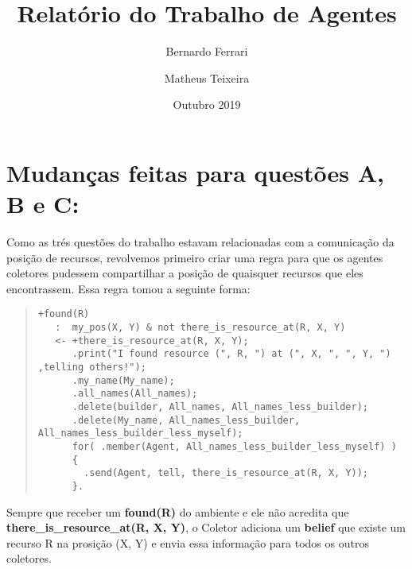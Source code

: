 \documentclass[12pt]{article}
\title{Relatório do Trabalho de Agentes}
\author{Bernardo Ferrari \and Matheus Teixeira}
\date{Outubro 2019}
\begin{document}
\maketitle

\section{Mudanças feitas para questões A, B e C:}

Como as trés questões do trabalho estavam relacionadas com a comunicação da posição de recursos,
revolvemos primeiro criar uma regra para que os agentes coletores
pudessem compartilhar a posição de quaisquer recursos que eles encontrassem.
Essa regra tomou a seguinte forma:
\begin{quote}
\begin{verbatim}
+found(R)
   :  my_pos(X, Y) & not there_is_resource_at(R, X, Y)
   <- +there_is_resource_at(R, X, Y);
      .print("I found resource (", R, ") at (", X, ", ", Y, ") ,telling others!");
      .my_name(My_name);
      .all_names(All_names);
      .delete(builder, All_names, All_names_less_builder);
      .delete(My_name, All_names_less_builder, All_names_less_builder_less_myself);
      for( .member(Agent, All_names_less_builder_less_myself) )
      {
        .send(Agent, tell, there_is_resource_at(R, X, Y));
      }.
\end{verbatim}
\end{quote}

Sempre que receber um \textbf{found(R)} do ambiente e ele não acredita que \textbf{there\_is\_resource\_at(R, X, Y)},
o Coletor adiciona um \textbf{belief} que existe um recurso {R} na prosição {(X, Y)} e envia essa informação para todos
os outros coletores.
\end{document}
